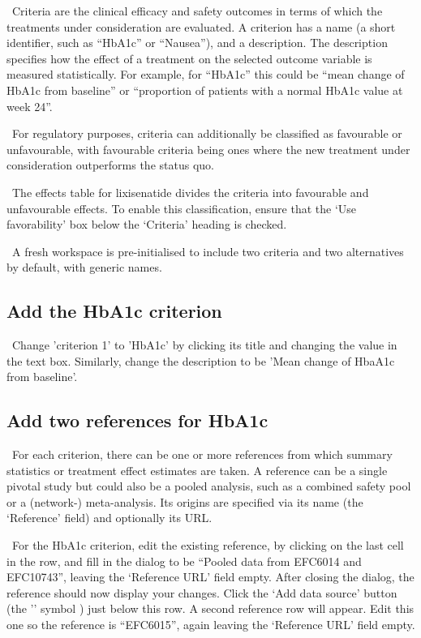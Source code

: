 \documentclass[00_mcda_tutorial.tex]{subfiles}
\begin{document}
\noindent \faGraduationCap \, Criteria are the clinical efficacy and safety outcomes in terms of which the treatments under consideration are evaluated. A criterion has a name (a short identifier, such as  “HbA1c” or “Nausea”), and a description. The description specifies how the effect of a treatment on the selected outcome variable is measured statistically. For example, for “HbA1c” this could be “mean change of HbA1c from baseline” or “proportion of patients with a normal HbA1c value at week 24”.
\newline

\noindent \faGraduationCap \, For regulatory purposes, criteria can additionally be classified as favourable or unfavourable, with favourable criteria being ones where the new treatment under consideration outperforms the status quo.

\noindent \leftpointright \, The effects table for lixisenatide divides the criteria into favourable and unfavourable effects. To enable this classification, ensure that the ‘Use favorability’ box below the ‘Criteria’ heading is checked.
\newline

\noindent \faGraduationCap \, A fresh workspace is pre-initialised to include two criteria and two alternatives by default, with generic names.

\subsection*{Add the HbA1c criterion}
\noindent \leftpointright \, Change 'criterion 1' to 'HbA1c' by clicking its title and changing the value in the text box. Similarly, change the description to be 'Mean change of HbaA1c from baseline'.

\subsection*{Add two references for HbA1c}
\noindent \faGraduationCap \, For each criterion, there can be one or more references from which summary statistics or treatment effect estimates are taken. A reference can be a single pivotal study but could also be a pooled analysis, such as a combined safety pool or a (network-) meta-analysis. Its origins are specified via its name (the ‘Reference’ field) and optionally its URL.
\newline

\noindent \leftpointright \, For the HbA1c criterion, edit the existing reference, by clicking on the last cell in the row, and fill in the dialog to be  “Pooled data from EFC6014 and EFC10743”, leaving the ‘Reference URL’ field empty. After closing the dialog, the reference should now display your changes. Click  the ‘Add data source’ button (the '\+' symbol ) just below this row. A second reference row will appear. Edit this one so the reference is “EFC6015”, again leaving the ‘Reference URL’ field empty.
\end{document}
